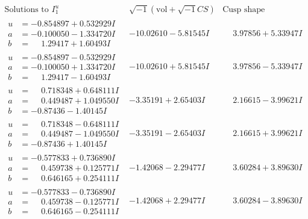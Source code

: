 \documentclass[1p]{elsarticle_modified}
\theoremstyle{definition}
\newcommand{\I}{\sqrt{-1}}
\begin{document}
$$\begin{array}{c|c|c}  
\text{Solutions to }I^u_{1}& \I (\text{vol} + \sqrt{-1}CS) & \text{Cusp shape}\\
 \hline 
\begin{aligned}
u &= -0.854897 + 0.532929 I \\
a &= -0.100050 - 1.334720 I \\
b &= \phantom{-}1.29417 + 1.60493 I\end{aligned}
 & -10.02610 - 5.81545 I & \phantom{-}3.97856 + 5.33947 I \\ \hline\begin{aligned}
u &= -0.854897 - 0.532929 I \\
a &= -0.100050 + 1.334720 I \\
b &= \phantom{-}1.29417 - 1.60493 I\end{aligned}
 & -10.02610 + 5.81545 I & \phantom{-}3.97856 - 5.33947 I \\ \hline\begin{aligned}
u &= \phantom{-}0.718348 + 0.648111 I \\
a &= \phantom{-}0.449487 + 1.049550 I \\
b &= -0.87436 - 1.40145 I\end{aligned}
 & -3.35191 + 2.65403 I & \phantom{-}2.16615 - 3.99621 I \\ \hline\begin{aligned}
u &= \phantom{-}0.718348 - 0.648111 I \\
a &= \phantom{-}0.449487 - 1.049550 I \\
b &= -0.87436 + 1.40145 I\end{aligned}
 & -3.35191 - 2.65403 I & \phantom{-}2.16615 + 3.99621 I \\ \hline\begin{aligned}
u &= -0.577833 + 0.736890 I \\
a &= \phantom{-}0.459738 + 0.125771 I \\
b &= \phantom{-}0.646165 + 0.254111 I\end{aligned}
 & -1.42068 - 2.29477 I & \phantom{-}3.60284 + 3.89630 I \\ \hline\begin{aligned}
u &= -0.577833 - 0.736890 I \\
a &= \phantom{-}0.459738 - 0.125771 I \\
b &= \phantom{-}0.646165 - 0.254111 I\end{aligned}
 & -1.42068 + 2.29477 I & \phantom{-}3.60284 - 3.89630 I \\ \hline\begin{aligned}

\end{aligned}
\end{array}$$
\end{document}
